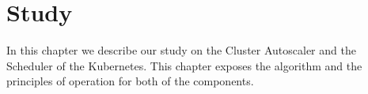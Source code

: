 \chapter{Study} \label{chapter:study}

In this chapter we describe our study on the Cluster Autoscaler and the
Scheduler of the Kubernetes. This chapter exposes the algorithm and the
principles of operation for both of the components. 
